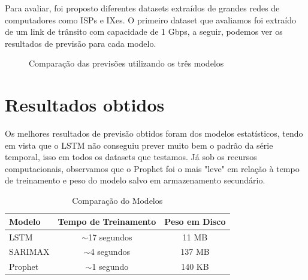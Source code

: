 \documentclass[12pt]{article}
\begin{document}
Para avaliar, foi proposto diferentes datasets extraídos de grandes redes de computadores como ISPs e IXes. O primeiro dataset que avaliamos foi extraído de um link de trânsito com capacidade de 1 Gbps, a seguir, podemos ver os resultados de previsão para cada modelo.

\begin{figure}[!htb]
    \label{fig:forecasting}
    \hfill
    \caption{Comparação das previsões utilizando os três modelos}
\end{figure}

\section{Resultados obtidos}

Os melhores resultados de previsão obtidos foram dos modelos estatísticos, tendo em vista que o LSTM não conseguiu prever muito bem o padrão da série temporal, isso em todos os datasets que testamos. Já sob os recursos computacionais, observamos que o Prophet foi o mais "leve" em relação à tempo de treinamento e peso do modelo salvo em armazenamento secundário.

\begin{table}[ht]
\centering
\caption{Comparação do Modelos}
\label{tab:comparing}
\begin{tabular}{lcc}
\toprule
\textbf{Modelo} & \textbf{Tempo de Treinamento} & \textbf{Peso em Disco} \\
\midrule
LSTM     & $\sim$17 segundos & 11 MB \\
SARIMAX & $\sim$4 segundos & 137 MB \\
Prophet  & $\sim$1 segundo   & 140 KB \\
\bottomrule
\end{tabular}
\end{table}
\end{document}
